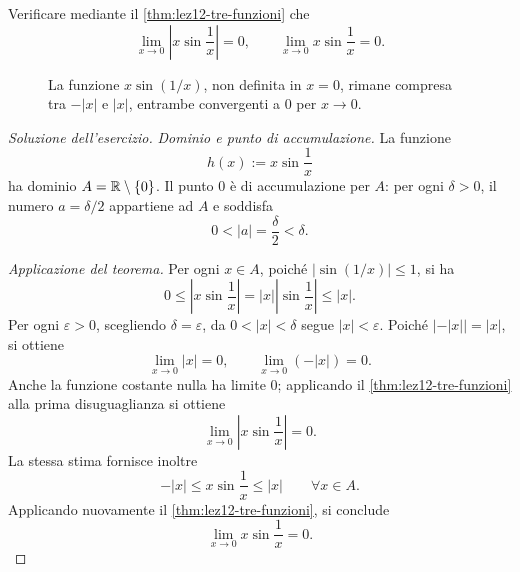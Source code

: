 \clearpage

\begin{exercise}
\label{ex:lez12-limite-seno-inverso}
Verificare mediante il \cref{thm:lez12-tre-funzioni} che
\[
  \lim_{x\to0}\left|x\sin\frac1x\right|=0,
  \qquad
  \lim_{x\to0}x\sin\frac1x=0.
\]
\end{exercise}

\begin{figure}[htbp]
  \centering
  
  \caption{La funzione \(x\sin(1/x)\), non definita in
  \(x=0\), rimane compresa tra \(-|x|\) e \(|x|\),
  entrambe convergenti a \(0\) per \(x\to0\).}
  \label{fig:lez12-seno-inverso}
\end{figure}

\begin{proof}[Soluzione dell'esercizio]
\emph{Dominio e punto di accumulazione.}
La funzione
\[
  h(x):=x\sin\frac1x
\]
ha dominio \(A=\mathbb{R}\setminus\{0\}\). Il punto \(0\) è di
accumulazione per \(A\): per ogni \(\delta>0\), il
numero \(a=\delta/2\) appartiene ad \(A\) e soddisfa
\[
  0<|a|=\frac\delta2<\delta.
\]

\emph{Applicazione del teorema.}
Per ogni \(x\in A\), poiché
\(\lvert\sin(1/x)\rvert\le1\), si ha
\[
  0\le\left|x\sin\frac1x\right|
  =|x|\left|\sin\frac1x\right|\le|x|.
\]
Per ogni \(\varepsilon>0\), scegliendo
\(\delta=\varepsilon\), da \(0<|x|<\delta\)
segue \(|x|<\varepsilon\). Poiché
\(|-|x||=|x|\), si ottiene
\[
  \lim_{x\to0}|x|=0,
  \qquad
  \lim_{x\to0}(-|x|)=0.
\]
Anche la funzione costante nulla ha limite
\(0\); applicando il \cref{thm:lez12-tre-funzioni}
alla prima disuguaglianza si ottiene
\[
  \lim_{x\to0}\left|x\sin\frac1x\right|=0.
\]
La stessa stima fornisce inoltre
\[
  -|x|\le x\sin\frac1x\le|x|
  \qquad\forall x\in A.
\]
Applicando nuovamente il \cref{thm:lez12-tre-funzioni},
si conclude
\[
  \lim_{x\to0}x\sin\frac1x=0.
\]
\end{proof}
